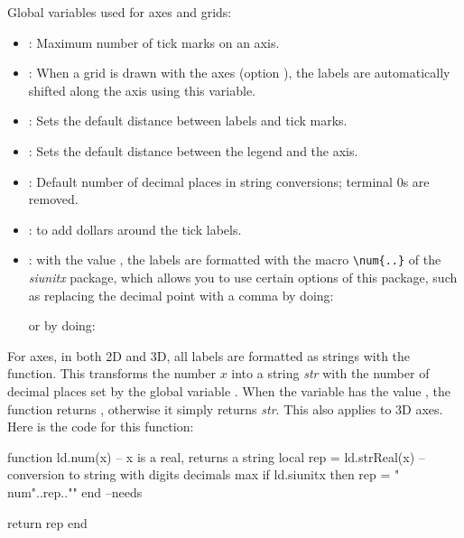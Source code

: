 Global variables used for axes and grids:
\begin{itemize}
    \item {}: Maximum number of tick marks on an axis.
    \item {}: When a grid is drawn with the axes (option ), the labels are automatically shifted along the axis using this variable.
    \item {}: Sets the default distance between labels and tick marks.
    \item {}: Sets the default distance between the legend and the axis.
    \item {}: Default number of decimal places in string conversions; terminal $0$s are removed.     
    \item {}: to add dollars around the tick labels.
    \item {}: with the value \true, the labels are formatted with the macro \verb|\num{..}| of the \emph{siunitx} package, which allows you to use certain options of this package, such as replacing the decimal point with a comma by doing: \par
\begin{TeXcode}
\usepackage[local=FR]{siunitx}
\end{TeXcode}
or by doing:
\begin{TeXcode}
\usepackage{siunitx}
\end{TeXcode}
\end{itemize}
For axes, in both 2D and 3D, all labels are formatted as strings with the  function. This transforms the number $x$ into a string \emph{str} with the number of decimal places set by the global variable . When the  variable has the value \true, the function returns , otherwise it simply returns \emph{str}. This also applies to 3D axes. Here is the code for this function:
\begin{Luacode}
function ld.num(x) -- x is a real, returns a string
    local rep = ld.strReal(x) -- conversion to string with digits decimals max
    if ld.siunitx then rep = "\\num{"..rep.."}" end --needs \usepackage{siunitx}
    return rep
end
\end{Luacode}

